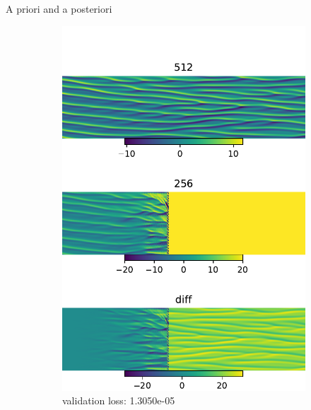 \documentclass[paper slide]{beamer}
\begin{document}
\begin{frame}{A priori and a posteriori}
\begin{figure}[ht]
\begin{subfigure}[b]{0.32\textwidth}
			\includegraphics[width=\textwidth]{fig/ks_nu0.1_N1512N2256_correct_cmp_lr2e-4.pdf} 
			\caption{validation loss: 1.3050e-05} 
		\end{subfigure}
		\begin{subfigure}[b]{0.32\textwidth}
			\centering 

\end{subfigure}
\end{figure}
\end{frame}
\end{document}
